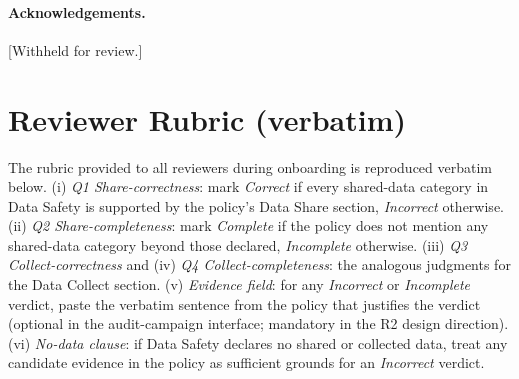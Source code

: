 \documentclass[11pt,a4paper]{article}
\begin{document}
\paragraph{Acknowledgements.}
[Withheld for review.]

\appendix

\section{Reviewer Rubric (verbatim)}
\label{app:rubric}
The rubric provided to all reviewers during onboarding is reproduced
verbatim below. (i) \emph{Q1 Share-correctness}: mark
\emph{Correct} if every shared-data category in Data Safety is
supported by the policy's Data Share section, \emph{Incorrect}
otherwise. (ii) \emph{Q2 Share-completeness}: mark
\emph{Complete} if the policy does not mention any shared-data
category beyond those declared, \emph{Incomplete} otherwise.
(iii) \emph{Q3 Collect-correctness} and (iv) \emph{Q4
Collect-completeness}: the analogous judgments for the Data
Collect section. (v) \emph{Evidence field}: for any
\emph{Incorrect} or \emph{Incomplete} verdict, paste the verbatim
sentence from the policy that justifies the verdict (optional in
the audit-campaign interface; mandatory in the R2 design direction).
(vi) \emph{No-data clause}: if Data Safety declares no shared or
collected data, treat any candidate evidence in the policy as
sufficient grounds for an \emph{Incorrect} verdict.


\end{document}
